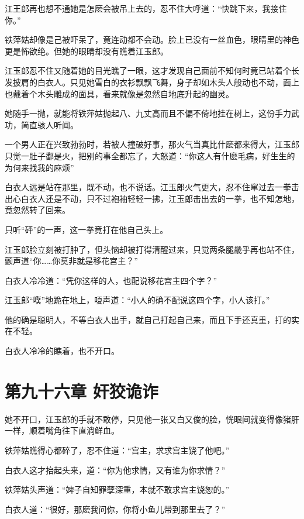\documentclass[12pt,oneside]{book}
\begin{document}
江王郎再也想不通她是怎麽会被吊上去的，忍不住大呼道：``快跳下来，我接住你。''

铁萍姑却像是己被吓呆了，竟连动都不会动。脸上已没有一丝血色，眼睛里的神色更是怖欲绝。但她的眼睛却没有瞧着江玉郎。

江玉郎忍不住又随着她的目光瞧了一眼，这才发现自己面前不知何时竟已站着个长发披肩的白衣人。只见她雪白的衣衫飘飘飞舞，身子却如木头人般动也不动，面上也戴着个木头雕成的面具，看来就像是忽然自地底升起的幽灵。

她随手一抛，就能将铁萍姑抛起八、九丈高而且不偏不倚地挂在树上，这份手力武功，简直骇人听闻。

一个男人正在兴致勃勃时，若被人撞破好事，那火气当真比什麽都来得大，江玉郎只觉一肚子鄱是火，把别的事全都忘了，大怒道：``你这人有什麽毛病，好生生的为何来找我的麻烦''

白衣人远是站在那里，既不动，也不说话。江玉郎火气更大，忍不住窜过去一拳击出心白衣人还是不动，只不过袍袖轻轻一拂，江玉郎击出去的一拳，也不知怎地，竟忽然转了回来。

只听``砰''的一声，这一拳竟打在他自己头上。

江玉郎脸立刻被打肿了，但头恼却被打得清醒过来，只觉两条腿畿乎再也站不住，颤声道``你\ldots\ldots 你莫非就是移花宫主？''

白衣人冷冷道：``凭你这样的人，也配说移花宫主四个字？''

江玉郎``噗''地跪在地上，嗄声道：``小人的确不配说这四个字，小人该打。''

他的确是聪明人，不等白衣人出手，就自己打起自己来，而且下手还真重，打的实在不轻。

白衣人冷冷的瞧着，也不开口。

\hypertarget{ux7b2cux4e5dux5341ux516dux7ae0-ux5978ux72e1ux8be1ux8bc8}{%
\chapter{第九十六章
奸狡诡诈}\label{ux7b2cux4e5dux5341ux516dux7ae0-ux5978ux72e1ux8be1ux8bc8}}

她不开口，江玉郎的手就不敢停，只见他一张又白又俊的脸，恍眼间就变得像猪肝一样，顺着嘴角往下直淌鲜血。

铁萍姑瞧得心都碎了，忍不住道：``宫主，求求宫主饶了他吧。''

白衣人这才抬起头来，道：``你为他求情，又有谁为你求情？''

铁萍姑头声道：``婢子自知罪孽深重，本就不敢求宫主饶恕的。''

白衣人道：``很好，那麽我问你，你将小鱼儿带到那里去了？''
\end{document}
